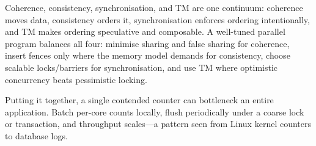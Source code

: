 \begin{center}
\end{center}

Coherence, consistency, synchronisation, and TM are one continuum: coherence moves data,
consistency orders it, synchronisation enforces ordering intentionally, and TM makes
ordering speculative and composable. A well-tuned parallel program balances all four:
minimise sharing and false sharing for coherence, insert fences only where the memory
model demands for consistency, choose scalable locks/barriers for synchronisation, and
use TM where optimistic concurrency beats pessimistic locking.

Putting it together, a single contended counter can bottleneck an entire application.
Batch per-core counts locally, flush periodically under a coarse lock or transaction,
and throughput scales---a pattern seen from Linux kernel counters to database logs.

